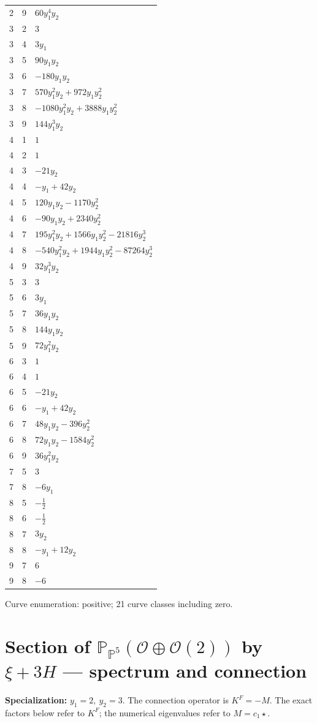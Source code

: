\documentclass[10pt,a4paper]{article}
\begin{document}
{\begin{longtable}{rrp{125mm}}
2 & 9 & $60 y_{1}^{4} y_{2}$\\
3 & 2 & $3$\\
3 & 4 & $3 y_{1}$\\
3 & 5 & $90 y_{1} y_{2}$\\
3 & 6 & $- 180 y_{1} y_{2}$\\
3 & 7 & $570 y_{1}^{2} y_{2} + 972 y_{1} y_{2}^{2}$\\
3 & 8 & $- 1080 y_{1}^{2} y_{2} + 3888 y_{1} y_{2}^{2}$\\
3 & 9 & $144 y_{1}^{3} y_{2}$\\
4 & 1 & $1$\\
4 & 2 & $1$\\
4 & 3 & $- 21 y_{2}$\\
4 & 4 & $- y_{1} + 42 y_{2}$\\
4 & 5 & $120 y_{1} y_{2} - 1170 y_{2}^{2}$\\
4 & 6 & $- 90 y_{1} y_{2} + 2340 y_{2}^{2}$\\
4 & 7 & $195 y_{1}^{2} y_{2} + 1566 y_{1} y_{2}^{2} - 21816 y_{2}^{3}$\\
4 & 8 & $- 540 y_{1}^{2} y_{2} + 1944 y_{1} y_{2}^{2} - 87264 y_{2}^{3}$\\
4 & 9 & $32 y_{1}^{3} y_{2}$\\
5 & 3 & $3$\\
5 & 6 & $3 y_{1}$\\
5 & 7 & $36 y_{1} y_{2}$\\
5 & 8 & $144 y_{1} y_{2}$\\
5 & 9 & $72 y_{1}^{2} y_{2}$\\
6 & 3 & $1$\\
6 & 4 & $1$\\
6 & 5 & $- 21 y_{2}$\\
6 & 6 & $- y_{1} + 42 y_{2}$\\
6 & 7 & $48 y_{1} y_{2} - 396 y_{2}^{2}$\\
6 & 8 & $72 y_{1} y_{2} - 1584 y_{2}^{2}$\\
6 & 9 & $36 y_{1}^{2} y_{2}$\\
7 & 5 & $3$\\
7 & 8 & $- 6 y_{1}$\\
8 & 5 & $- \frac{1}{2}$\\
8 & 6 & $- \frac{1}{2}$\\
8 & 7 & $3 y_{2}$\\
8 & 8 & $- y_{1} + 12 y_{2}$\\
9 & 7 & $6$\\
9 & 8 & $-6$\\
\end{longtable}}
Curve enumeration: positive; 21 curve classes including zero.
\clearpage\section*{Section of $\mathbb P_{\mathbb P^{5}}(\mathcal O\oplus \mathcal O(2))$ by $\xi +3H$ --- spectrum and connection}
\textbf{Specialization:} $y_1=2,\ y_2=3$. The connection operator is $K^F=-M$. The exact factors below refer to $K^F$; the numerical eigenvalues refer to $M=c_1\star$.
\end{document}
